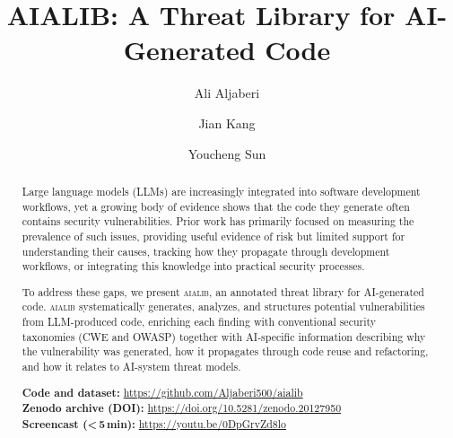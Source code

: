 \documentclass[sigconf,review,anonymous=false]{acmart}
\begin{document}
\title{\textsc{AIALIB}: A Threat Library for AI-Generated Code}

\author{Ali Aljaberi}

\author{Jian Kang}
  
\author{Youcheng Sun}
\renewcommand{\shortauthors}{Aljaberi et al.}

\begin{abstract}
Large language models (LLMs) are increasingly integrated into software
development workflows, yet a growing body of evidence shows that the code
they generate often contains security vulnerabilities. Prior work has
primarily focused on measuring the prevalence of such issues, providing
useful evidence of risk but limited support for understanding their causes,
tracking how they propagate through development workflows, or integrating
this knowledge into practical security processes.

To address these gaps, we present \textsc{aialib}, an annotated threat
library for AI-generated code. \textsc{aialib} systematically generates,
analyzes, and structures potential vulnerabilities from LLM-produced code, enriching each finding with conventional security taxonomies (CWE and OWASP) together with AI-specific information describing why the vulnerability was generated, how it propagates through code reuse and refactoring, and how it relates to AI-system threat models.


\smallskip\noindent
\textbf{Code and dataset:}
\url{https://github.com/Aljaberi500/aialib}\hfill\\
\textbf{Zenodo archive (DOI):}
\url{https://doi.org/10.5281/zenodo.20127950}\hfill\\
\textbf{Screencast (\textless\,5\,min):}
\url{https://youtu.be/0DpGrvZd8lo}
\end{abstract}
\end{document}
